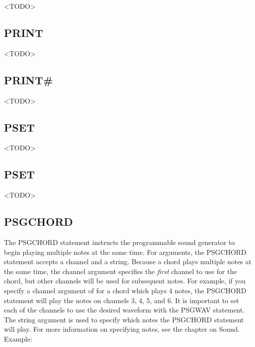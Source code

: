 <TODO>

\subsection{PRINT}

<TODO>

\subsection{PRINT\#}

<TODO>

\subsection{PSET}

<TODO>

\subsection{PSET}

<TODO>

\subsection{PSGCHORD}

The {\ttfamily PSGCHORD} statement instructs the programmable sound generator
to begin playing multiple notes at the same time.  For arguments, the
{\ttfamily PSGCHORD} statement accepts a channel and a string.  Because a chord
plays multiple notes at the same time, the channel argument specifies the
\emph{first} channel to use for the chord, but other channels will be used for
subsequent notes.  For example, if you specify a channel argument of {} for a chord which plays 4 notes, the {\ttfamily PSGCHORD} statement will
play the notes on channels 3, 4, 5, and 6.  It is important to set each of the
channels to use the desired waveform with the {\ttfamily PSGWAV} statement.
The string argument is used to specify which notes the {\ttfamily PSGCHORD}
statement will play.  For more information on specifying notes, see the chapter
on Sound.\\

Example:\\


